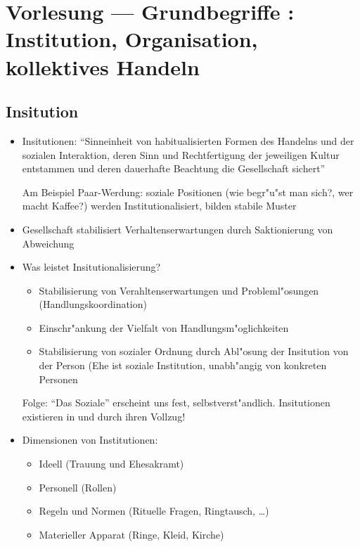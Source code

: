 
\section{Vorlesung  --- Grundbegriffe : Institution, Organisation, kollektives Handeln}
\subsection{Insitution}

\begin{itemize}
	\item
		Insitutionen: \enquote{Sinneinheit von habitualisierten Formen des Handelns und der sozialen Interaktion, deren Sinn und Rechtfertigung der jeweiligen Kultur entstammen und deren dauerhafte Beachtung die Gesellschaft sichert}

		 Am Beispiel Paar-Werdung: soziale Positionen (wie begr"u"st man sich?, wer macht Kaffee?) werden Institutionalisiert, bilden stabile Muster
	 \item
		 Gesellschaft stabilisiert Verhaltenserwartungen durch Saktionierung von Abweichung
	 \item
		 Was leistet Insitutionalisierung?
		 \begin{itemize}
			 \item
				 Stabilisierung von Verahltenserwartungen und Probleml"osungen (Handlungskoordination)
			 \item
				 Einschr"ankung der Vielfalt von Handlungsm"oglichkeiten
			 \item
				 Stabilisierung von sozialer Ordnung durch Abl"osung der Insitution von der Person (Ehe ist soziale Institution, unabh"angig von konkreten Personen
		 \end{itemize}
		 Folge: \enquote{Das Soziale} erscheint uns fest, selbstverst"andlich. Insitutionen existieren in und durch ihren Vollzug!

	 \item
		 Dimensionen von Institutionen:
		 \begin{itemize}
			 \item
				 Ideell (Trauung und Ehesakramt)
			 \item
				 Personell (Rollen)
			 \item
				 Regeln und Normen (Rituelle Fragen, Ringtausch, \dots)
			 \item
				 Materieller Apparat (Ringe, Kleid, Kirche)
		 \end{itemize}
\end{itemize}

